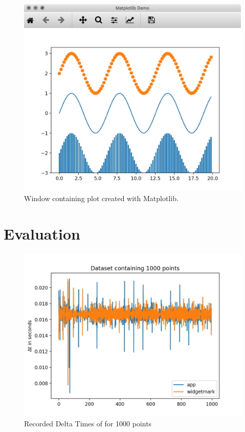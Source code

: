 \begin{figure}[h]
    \centering
    \includegraphics[width=14cm]{resources/img/MatplotlibDemo}
    \caption{Window containing plot created with Matplotlib.}
    \label{a:fig:matplotlib:window}
\end{figure}

\clearpage

\section{Evaluation}
\label{sec:appendix:evaluation}

\begin{figure}[h]
    \centering
    \includegraphics[width=12cm]{resources/img/evaluation/Eval_1000}
    \caption{
        Recorded Delta Times of for 1000 points
    }
\end{figure}



